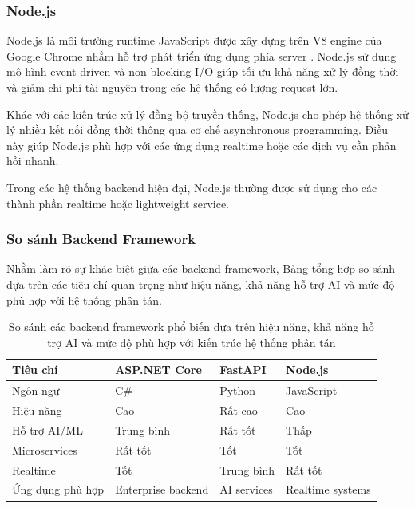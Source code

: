 
\subsubsection{Node.js}

Node.js là môi trường runtime JavaScript được xây dựng trên V8 engine của Google Chrome nhằm hỗ trợ phát triển ứng dụng phía server \parencite{nodejsdocs2024}. Node.js sử dụng mô hình event-driven và non-blocking I/O giúp tối ưu khả năng xử lý đồng thời và giảm chi phí tài nguyên trong các hệ thống có lượng request lớn.

Khác với các kiến trúc xử lý đồng bộ truyền thống, Node.js cho phép hệ thống xử lý nhiều kết nối đồng thời thông qua cơ chế asynchronous programming. Điều này giúp Node.js phù hợp với các ứng dụng realtime hoặc các dịch vụ cần phản hồi nhanh.

Trong các hệ thống backend hiện đại, Node.js thường được sử dụng cho các thành phần realtime hoặc lightweight service.

\subsubsection{So sánh Backend Framework}

Nhằm làm rõ sự khác biệt giữa các backend framework, Bảng  tổng hợp so sánh dựa trên các tiêu chí quan trọng như hiệu năng, khả năng hỗ trợ AI và mức độ phù hợp với hệ thống phân tán.

\begin{table}[H]
\centering
\caption{So sánh các backend framework phổ biến dựa trên hiệu năng, khả năng hỗ trợ AI và mức độ phù hợp với kiến trúc hệ thống phân tán}
\label{tab:backend_framework}
\renewcommand{\arraystretch}{1.3}

\begin{tabularx}{\linewidth}{|>{\raggedright\arraybackslash}X|>{\raggedright\arraybackslash}X|>{\raggedright\arraybackslash}X|>{\raggedright\arraybackslash}X|}
\hline
\textbf{Tiêu chí} & \textbf{ASP.NET Core} & \textbf{FastAPI} & \textbf{Node.js} \\ \hline
Ngôn ngữ & C\# & Python & JavaScript \\ \hline
Hiệu năng & Cao & Rất cao & Cao \\ \hline
Hỗ trợ AI/ML & Trung bình & Rất tốt & Thấp \\ \hline
Microservices & Rất tốt & Tốt & Tốt \\ \hline
Realtime & Tốt & Trung bình & Rất tốt \\ \hline
Ứng dụng phù hợp & Enterprise backend & AI services & Realtime systems \\ \hline
\end{tabularx}
\end{table}

